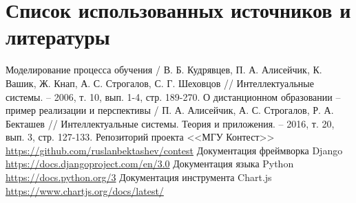 \documentclass[12pt, a4paper, oneside]{article}
\begin{document}
\section{Список использованных источников и литературы}
\begingroup
\renewcommand{\section}[2]{}
\begin{thebibliography}{20}
    Моделирование процесса обучения / В. Б. Кудрявцев, П. А. Алисейчик, К. Вашик, Ж. Кнап, А. С. Строгалов, С. Г. Шеховцов // Интеллектуальные системы. – 2006, т. 10, вып. 1-4, стр. 189-270.
    О дистанционном образовании – пример реализации и перспективы / П. А. Алисейчик, А. С. Строгалов, Р. А. Бекташев // Интеллектуальные системы. Теория и приложения. – 2016, т. 20, вып. 3, стр. 127-133.
    Репозиторий проекта <<МГУ Контест>>\\
    \url{https://github.com/ruslanbektashev/contest}
    Документация фреймворка Django\\
    \url{https://docs.djangoproject.com/en/3.0}
    Документация языка Python\\
    \url{https://docs.python.org/3}
    Документация инструмента Chart.js\\
    \url{https://www.chartjs.org/docs/latest/}
\end{thebibliography}
\endgroup
\end{document}

